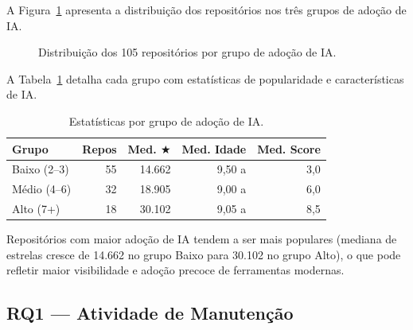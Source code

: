 \documentclass[12pt,a4paper,twocolumn]{article}
\begin{document}
A Figura~\ref{fig:grupos} apresenta a distribuição dos repositórios nos três
grupos de adoção de IA.

\begin{figure}[H]
\centering
{}
\caption{Distribuição dos 105 repositórios por grupo de adoção de IA.}
\label{fig:grupos}
\end{figure}

A Tabela~\ref{tab:grupos} detalha cada grupo com estatísticas de popularidade
e características de IA.

\begin{table}[H]
\centering
\caption{Estatísticas por grupo de adoção de IA.}
\label{tab:grupos}
\small
\setlength{\tabcolsep}{4pt}
\begin{tabular}{lrrrr}
\toprule
\textbf{Grupo} & \textbf{Repos} & \textbf{Med. $\bigstar$} & \textbf{Med. Idade} & \textbf{Med. Score} \\
\midrule
Baixo (2--3) & 55 & 14.662 & 9,50 a & 3,0 \\
Médio (4--6) & 32 & 18.905 & 9,00 a & 6,0 \\
Alto (7+)    & 18 & 30.102 & 9,05 a & 8,5 \\
\bottomrule
\end{tabular}
\end{table}

Repositórios com maior adoção de IA tendem a ser mais populares (mediana de estrelas
cresce de 14.662 no grupo Baixo para 30.102 no grupo Alto), o que pode refletir maior
visibilidade e adoção precoce de ferramentas modernas.

\subsection{RQ1 --- Atividade de Manutenção}
\end{document}
